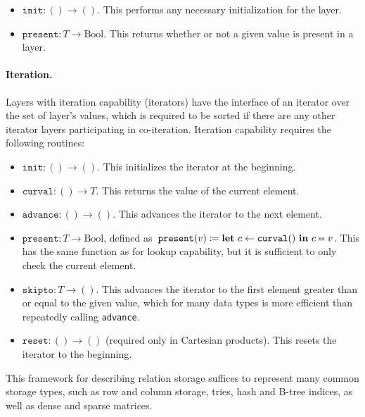 \documentclass[acmsmall,screen,nonacm]{acmart}\settopmatter{printfolios=true,printccs=false,printacmref=false}
\newcommand*{\Bool}{\mathrm{Bool}}
\newcommand*{\dblequals}{\mathrel{\mathrlap{\raisebox{0.1em}{-}}\raisebox{-0.1em}{-}\mathrlap{\raisebox{0.1em}{-}}\raisebox{-0.1em}{-}}}
\begin{document}
\begin{itemize}
    \item $\texttt{init} \colon () \longrightarrow ()$.
    This performs any necessary initialization for the layer.
    \item $\texttt{present} \colon T \longrightarrow \Bool$. This returns whether or not a given value is present in a layer.
\end{itemize}

\paragraph{Iteration.} Layers with iteration capability (iterators) have the interface of an iterator
\cite{indexed-streams}
over the set of layer's values,
which is required to be sorted if there are any other iterator layers participating in co-iteration.
Iteration capability requires the following routines:

\begin{itemize}
    \item $\texttt{init} \colon () \longrightarrow ()$. This initializes the iterator at the beginning.
    \item $\texttt{curval} \colon () \longrightarrow T$. This returns the value of the current element.
    \item $\texttt{advance} \colon () \longrightarrow ()$. This advances the iterator to the next element.
    \item $\texttt{present} \colon T \longrightarrow \Bool$,
        defined as\, $\texttt{present}(v) \coloneqq \mathbf{let}\ c \gets \texttt{curval}()\ \mathbf{in}\ c \dblequals v$.
        This has the same function as for lookup capability, but it is sufficient to only check the current element.
    \item $\texttt{skipto} \colon T \longrightarrow ()$. This advances the iterator to the first element greater than
    or equal to the given value, which for many data types is more efficient than repeatedly calling \texttt{advance}.
    \item $\texttt{reset} \colon () \longrightarrow ()$ (required only in Cartesian products). This resets the iterator to the beginning.
\end{itemize}

This framework for describing relation storage suffices to
represent many common storage types, such as 
    row and
    column storage,
    tries,
    hash and B-tree indices, as well as dense and sparse matrices.
\end{document}
